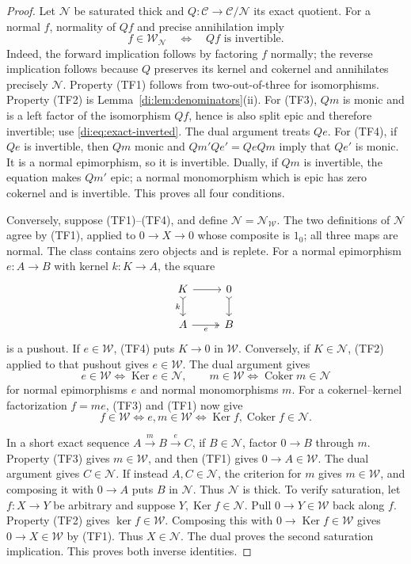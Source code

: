 \documentclass[11pt,reqno,a4paper]{amsart}
\theoremstyle{definition}
\theoremstyle{remark}
\newcommand{\C}{\mathcal{C}}
\newcommand{\N}{\mathcal{N}}
\newcommand{\0}{\mathbf{0}}
\renewcommand{\1}{\mathbf{1}}
\DeclareMathOperator{\Ker}{Ker}
\DeclareMathOperator{\Coker}{Coker}
\begin{document}
\begin{proof}
Let $\N$ be saturated thick and $Q:\C\to\C/\N$ its exact quotient.
For a normal $f$, normality of $Qf$ and precise annihilation imply
\begin{equation}\label{di:eq:exact-inverted}
 f\in\mathcal W_{\N}\quad\Longleftrightarrow\quad Qf
 \text{ is invertible}.
\end{equation}
Indeed, the forward implication follows by factoring $f$ normally;
the reverse implication follows because $Q$ preserves its kernel
and cokernel and annihilates precisely $\N$. Property (TF1) follows
from two-out-of-three for isomorphisms. Property (TF2) is
Lemma~\ref{di:lem:denominators}(ii). For (TF3), $Qm$ is monic
and is a left factor of the isomorphism $Qf$, hence is also split
epic and therefore invertible; use \eqref{di:eq:exact-inverted}.
The dual argument treats $Qe$. For (TF4), if $Qe$ is invertible,
then $Qm$ monic and $Qm'Qe'=QeQm$ imply that $Qe'$ is monic.
It is a normal epimorphism, so it is invertible. Dually, if $Qm$
is invertible, the equation makes $Qm'$ epic; a normal monomorphism
which is epic has zero cokernel and is invertible. This proves all
four conditions.

Conversely, suppose (TF1)--(TF4), and define $\N=\N_{\mathcal W}$.
The two definitions of $\N$ agree by (TF1), applied to
$0\to X\to0$ whose composite is $1_0$; all three maps are normal.
The class contains zero objects and is replete.
For a normal epimorphism $e:A\to B$ with kernel $k:K\to A$,
the square
\[
\begin{tikzcd}
 K\arrow[r]\arrow[d,tail,"k"']&0\arrow[d,tail]\\
 A\arrow[r,two heads,"e"']&B
\end{tikzcd}
\]
is a pushout. If $e\in\mathcal W$, (TF4) puts $K\to0$ in
$\mathcal W$. Conversely, if $K\in\N$, (TF2) applied to that
pushout gives $e\in\mathcal W$. The dual argument gives
\[
 e\in\mathcal W\Longleftrightarrow\Ker e\in\N,
 \qquad
 m\in\mathcal W\Longleftrightarrow\Coker m\in\N
\]
for normal epimorphisms $e$ and normal monomorphisms $m$.
For a cokernel--kernel factorization $f=me$, (TF3) and (TF1) now give
\[
 f\in\mathcal W\Longleftrightarrow e,m\in\mathcal W
 \Longleftrightarrow\Ker f,\Coker f\in\N.
\]

In a short exact sequence $A\xrightarrow{m}B\xrightarrow{e}C$,
if $B\in\N$, factor $0\to B$ through $m$. Property (TF3) gives
$m\in\mathcal W$, and then (TF1) gives $0\to A\in\mathcal W$.
The dual argument gives $C\in\N$. If instead $A,C\in\N$, the
criterion for $m$ gives $m\in\mathcal W$, and composing it with
$0\to A$ puts $B$ in $\N$. Thus $\N$ is thick.
To verify saturation, let $f:X\to Y$ be arbitrary and suppose
$Y,\Ker f\in\N$. Pull $0\to Y\in\mathcal W$ back along $f$.
Property (TF2) gives $\ker f\in\mathcal W$. Composing this with
$0\to\Ker f\in\mathcal W$ gives $0\to X\in\mathcal W$ by
(TF1). Thus $X\in\N$. The dual proves the second saturation
implication. This proves both inverse identities.


\end{proof}
\end{document}
